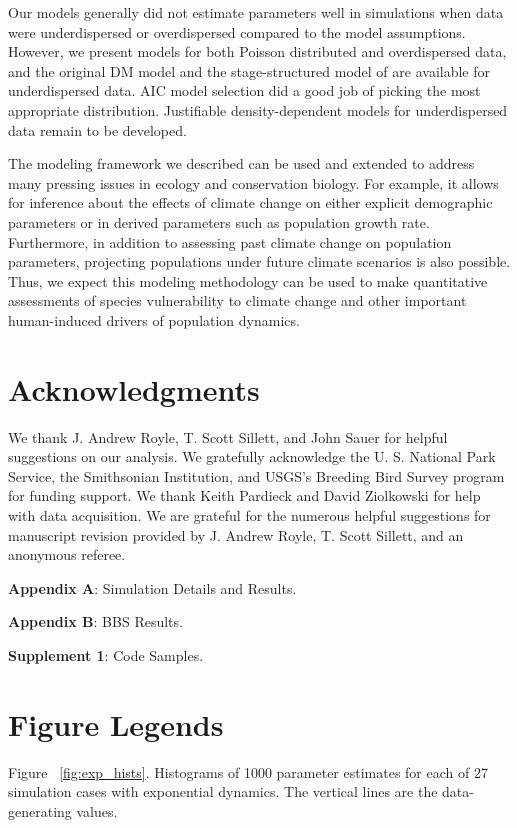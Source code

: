 \documentclass[12pt,english]{article}
\begin{document}
\begin{spacing}{1.9}
\begin{flushleft}
Our models generally did not estimate parameters well in simulations when data were underdispersed
or overdispersed compared to the model assumptions.  However, we present models for
both Poisson distributed and overdispersed data, and the original DM model and the 
stage-structured model of \citet{zipkin_etal:2014} are available for underdispersed data.  AIC model
selection did a good job of picking the most appropriate distribution.  Justifiable 
density-dependent models
for underdispersed data remain to be developed.

The modeling framework we described can be used and extended to address many
pressing issues in ecology and conservation biology. For
example,
it allows for inference 
about the effects of climate change on either explicit
demographic parameters or in derived parameters such as
population growth rate. Furthermore, 
in addition to assessing past climate change on population
parameters, projecting populations under future climate scenarios is also
possible. Thus, we expect this modeling methodology can be used
to make quantitative assessments of species vulnerability to climate
change and other important human-induced drivers of population
dynamics.


\section*{Acknowledgments}

We thank J. Andrew Royle, T. Scott Sillett, and John Sauer for helpful suggestions on our analysis. 
We gratefully acknowledge the U. S. National Park 
Service, the Smithsonian Institution, and USGS's Breeding Bird Survey program for funding support.
We thank Keith Pardieck and David Ziolkowski for help with data acquisition. We are
grateful for the numerous helpful suggestions for manuscript
revision provided by J. Andrew Royle, T. Scott Sillett, and an anonymous
referee.



\begin{center}
\noindent{}\textbf{Appendix A}: Simulation Details and Results.

\noindent{}\textbf{Appendix B}: BBS Results.

\noindent{}\textbf{Supplement 1}: Code Samples.
\end{center}

\newpage


\clearpage

\section*{Figure Legends}
\noindent Figure ~\ref{fig:exp_hists}. Histograms of 1000 parameter estimates for each of 27
simulation cases with exponential dynamics. The vertical lines are the 
data-generating values.


\end{flushleft}
\end{spacing}
\end{document}
